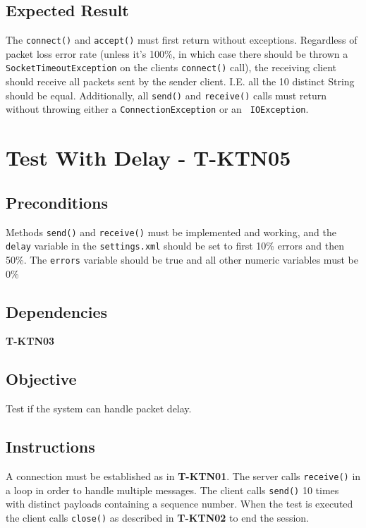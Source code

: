 \documentclass{article}
\begin{document}
\subsection{Expected Result}

The \texttt{connect()} and \texttt{accept()} must first return without
exceptions. Regardless of packet loss error rate (unless it's 100\%, in
which case there should be thrown a \texttt{SocketTimeoutException} on the
clients \texttt{connect()} call), the receiving client should receive all
packets sent by the sender client. I.E. all the 10 distinct String should be
equal. Additionally, all \texttt{send()} and \texttt{receive()} calls must
return without throwing either a \texttt{ConnectionException} or an \texttt{%
IOException}.

\section{Test With Delay - T-KTN05}

\subsection{Preconditions}

Methods \texttt{send()} and \texttt{receive()} must be implemented and
working, and the \texttt{delay} variable in the \texttt{settings.xml} should
be set to first 10\% errors and then 50\%. The \texttt{errors} variable
should be true and all other numeric variables must be 0\%

\subsection{Dependencies}

\textbf{T-KTN03}

\subsection{Objective}

Test if the system can handle packet delay.

\subsection{Instructions}

A connection must be established as in \textbf{T-KTN01}. The server calls 
\texttt{receive()} in a loop in order to handle multiple messages. The
client calls \texttt{send()} 10 times with distinct payloads containing a
sequence number. When the test is executed the client calls \texttt{close()}
as described in \textbf{T-KTN02} to end the session.
\end{document}
